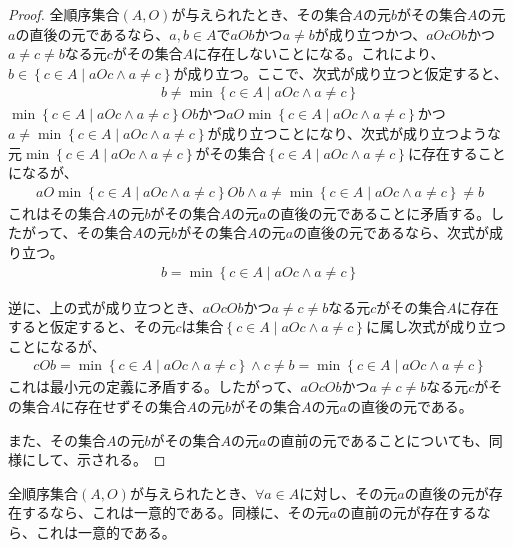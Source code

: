 \documentclass[dvipdfmx]{jsarticle}
\begin{document}
\begin{proof}
全順序集合$(A,O)$が与えられたとき、その集合$A$の元$b$がその集合$A$の元$a$の直後の元であるなら、$a,b \in A$で$aOb$かつ$a \neq b$が成り立つかつ、$aOcOb$かつ$a \neq c \neq b$なる元$c$がその集合$A$に存在しないことになる。これにより、$b \in \left\{ c \in A \middle| aOc \land a \neq c \right\}$が成り立つ。ここで、次式が成り立つと仮定すると、
\begin{align*}
b \neq \min\left\{ c \in A \middle| aOc \land a \neq c \right\}
\end{align*}
$\min\left\{ c \in A \middle| aOc \land a \neq c \right\} Ob$かつ$aO\min\left\{ c \in A \middle| aOc \land a \neq c \right\}$かつ$a \neq \min\left\{ c \in A \middle| aOc \land a \neq c \right\}$が成り立つことになり、次式が成り立つような元$\min\left\{ c \in A \middle| aOc \land a \neq c \right\}$がその集合$\left\{ c \in A \middle| aOc \land a \neq c \right\}$に存在することになるが、
\begin{align*}
aO\min\left\{ c \in A \middle| aOc \land a \neq c \right\} Ob \land a \neq \min\left\{ c \in A \middle| aOc \land a \neq c \right\} \neq b
\end{align*}
これはその集合$A$の元$b$がその集合$A$の元$a$の直後の元であることに矛盾する。したがって、その集合$A$の元$b$がその集合$A$の元$a$の直後の元であるなら、次式が成り立つ。
\begin{align*}
b = \min\left\{ c \in A \middle| aOc \land a \neq c \right\}
\end{align*}\par
逆に、上の式が成り立つとき、$aOcOb$かつ$a \neq c \neq b$なる元$c$がその集合$A$に存在すると仮定すると、その元$c$は集合$\left\{ c \in A \middle| aOc \land a \neq c \right\}$に属し次式が成り立つことになるが、
\begin{align*}
cOb = \min\left\{ c \in A \middle| aOc \land a \neq c \right\} \land c \neq b = \min\left\{ c \in A \middle| aOc \land a \neq c \right\}
\end{align*}
これは最小元の定義に矛盾する。したがって、$aOcOb$かつ$a \neq c \neq b$なる元$c$がその集合$A$に存在せずその集合$A$の元$b$がその集合$A$の元$a$の直後の元である。\par
また、その集合$A$の元$b$がその集合$A$の元$a$の直前の元であることについても、同様にして、示される。
\end{proof}
\begin{thm}\label{1.3.2.3}
全順序集合$(A,O)$が与えられたとき、$\forall a \in A$に対し、その元$a$の直後の元が存在するなら、これは一意的である。同様に、その元$a$の直前の元が存在するなら、これは一意的である。
\end{thm}
\end{document}
